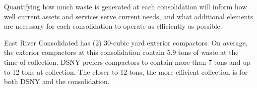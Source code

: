 
    Quantifying how much waste is generated at each consolidation will inform how well current assets and services serve current needs, and what additional elements are necessary for each consolidation to operate as efficiently as possible.
    
    East River Consolidated has (2) 30-cubic yard exterior compactors. On average, the exterior compactors at this consolidation contain 5.9 tons of waste at the time of collection. DSNY prefers compactors to contain more than 7 tons and up to 12 tons at collection. The closer to 12 tons, the more efficient collection is for both DSNY and the consolidation.